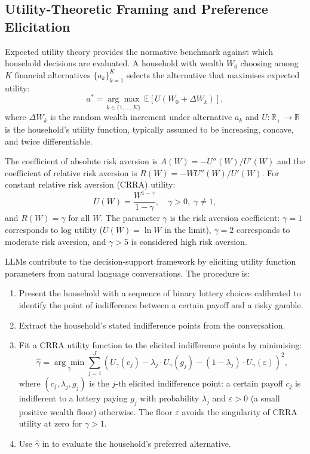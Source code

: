 \begin{context}
\subsection{Utility-Theoretic Framing and Preference Elicitation}
\label{subsec:utility-elicitation}

Expected utility theory provides the normative benchmark against which household decisions are evaluated. A household with wealth $W_0$ choosing among $K$ financial alternatives $\{a_k\}_{k=1}^K$ selects the alternative that maximises expected utility:
\begin{equation}
  a^* = \underset{k \in \{1, \ldots, K\}}{\arg\max} \; \mathbb{E}\!\left[U(W_{0} + \Delta W_k)\right],
  \label{eq:expected-utility}
\end{equation}
where $\Delta W_k$ is the random wealth increment under alternative $a_k$ and $U : \mathbb{R}_{+} \to \mathbb{R}$ is the household's utility function, typically assumed to be increasing, concave, and twice differentiable.

The coefficient of absolute risk aversion is $A(W) = -U''(W) / U'(W)$ and the coefficient of relative risk aversion is $R(W) = -W U''(W) / U'(W)$. For constant relative risk aversion (CRRA) utility:
\begin{equation}
  U(W) = \frac{W^{1 - \gamma}}{1 - \gamma}, \quad \gamma > 0, \; \gamma \neq 1,
  \label{eq:crra}
\end{equation}
and $R(W) = \gamma$ for all $W$. The parameter $\gamma$ is the risk aversion coefficient: $\gamma = 1$ corresponds to log utility ($U(W) = \ln W$ in the limit), $\gamma = 2$ corresponds to moderate risk aversion, and $\gamma > 5$ is considered high risk aversion.

LLMs contribute to the decision-support framework by eliciting utility function parameters from natural language conversations. The procedure is:

\begin{enumerate}
  \item Present the household with a sequence of binary lottery choices calibrated to identify the point of indifference between a certain payoff and a risky gamble.
  \item Extract the household's stated indifference points from the conversation.
  \item Fit a CRRA utility function to the elicited indifference points by minimising:
    \begin{equation}
      \hat{\gamma} = \underset{\gamma}{\arg\min} \sum_{j=1}^{J} \left( U_\gamma(c_j) - \lambda_j \cdot U_\gamma(g_j) - (1 - \lambda_j) \cdot U_\gamma(\varepsilon) \right)^2,
      \label{eq:utility-fit}
    \end{equation}
    where $(c_j, \lambda_j, g_j)$ is the $j$-th elicited indifference point: a certain payoff $c_j$ is indifferent to a lottery paying $g_j$ with probability $\lambda_j$ and $\varepsilon > 0$ (a small positive wealth floor) otherwise. The floor $\varepsilon$ avoids the singularity of CRRA utility at zero for $\gamma > 1$.
  \item Use $\hat{\gamma}$ in  to evaluate the household's preferred alternative.
\end{enumerate}


\end{context}
